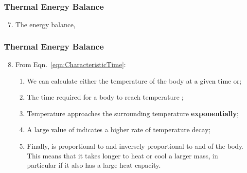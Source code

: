 \documentclass[10pt,compress,handout,ignorenonframetext,unknownkeysallowed]{beamer}
\begin{document}
\begin{frame}
 \frametitle{Thermal Energy Balance}
   \begin{enumerate}\setcounter{enumi}{6}%
     \item<1-> The energy balance,
   \end{enumerate}
\end{frame}

\begin{frame}
 \frametitle{Thermal Energy Balance}
   \begin{enumerate}\setcounter{enumi}{7}%
     \item<1-> From Eqn.~\ref{eqn:CharacteristicTime}:
        \begin{enumerate}%
           \item<1-> We can calculate either the temperature  of the body at a given time  or;
           \item<2-> The time  required for a body to reach temperature ;
           \item<3-> Temperature  approaches the surrounding temperature  {\bf exponentially};
           \item<4-> A large value of  indicates a higher rate of temperature decay;
           \item<5-> Finally,  is proportional to  and inversely proportional to  and  of the body. This means that it takes longer to heat or cool a larger mass, in particular if it also has a large heat capacity.
        \end{enumerate}
   \end{enumerate}
\end{frame}
\end{document}
